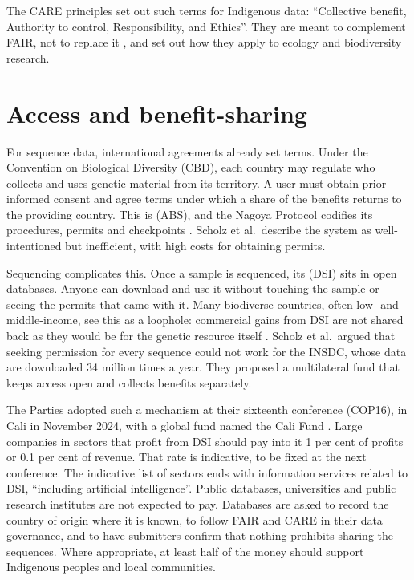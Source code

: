 The CARE principles set out such terms for Indigenous data: ``Collective benefit,
Authority to control, Responsibility, and Ethics''. They are meant to complement
FAIR, not to replace it \parencite{carroll2020care}, and
\textcite{jennings2023care} set out how they apply to ecology and biodiversity
research.

\section{Access and benefit-sharing}
\label{sec:abs}

For sequence data, international agreements already set terms. Under the
Convention on Biological Diversity (CBD), each country may regulate who
collects and uses genetic material from its territory. A user must obtain prior
informed consent and agree terms under which a share of the benefits returns
to the providing country. This is  (ABS), and
the Nagoya Protocol codifies its procedures, permits and checkpoints
\parencite{scholz2022dsi}. Scholz et al.\ describe the system as
well-intentioned but inefficient, with high costs for obtaining permits.

Sequencing complicates this. Once a sample is sequenced, its  (DSI) sits in open databases. Anyone can download and
use it without touching the sample or seeing the permits that came with it.
Many biodiverse countries, often low- and middle-income, see this as a loophole: commercial
gains from DSI are not shared back as they would be for the genetic resource
itself \parencite{scholz2022dsi}. Scholz et al.\ argued that seeking permission
for every sequence could not work for the INSDC, whose data are downloaded 34
million times a year. They proposed a multilateral fund that keeps access open
and collects benefits separately.

The Parties adopted such a mechanism at their sixteenth conference (COP16), in
Cali in November 2024, with a global fund named the Cali Fund
\parencite{cbd2024dsidecision}. Large companies in sectors that profit from DSI
should pay into it 1 per cent of profits or 0.1 per cent of revenue. That rate
is indicative, to be fixed at the next conference. The indicative list of
sectors ends with information services related to DSI, ``including artificial
intelligence''. Public databases, universities and public research institutes
are not expected to pay. Databases are asked to record the country of origin
where it is known, to follow FAIR and CARE in their data governance, and to
have submitters confirm that nothing prohibits sharing the sequences. Where
appropriate, at least half of the money should support Indigenous peoples and
local communities.

